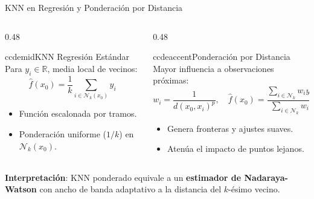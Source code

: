 \begin{frame}{KNN en Regresión y Ponderación por Distancia}
\begin{columns}[T,onlytextwidth]
\begin{column}{0.48\textwidth}
\begin{contrastbox}{ccdemid}{KNN Regresión Estándar}
\footnotesize
Para $y_i \in \mathbb{R}$, media local de vecinos:
\[
\hat{f}(x_0) = \frac{1}{k} \sum_{i \in \mathcal{N}_k(x_0)} y_i
\]
\begin{itemize}\setlength{\itemsep}{0.06em}
  \item Función escalonada por tramos.
  \item Ponderación uniforme ($1/k$) en $\mathcal{N}_k(x_0)$.
\end{itemize}
\end{contrastbox}
\end{column}

\begin{column}{0.48\textwidth}
\begin{contrastbox}{ccdeaccent}{Ponderación por Distancia}
\footnotesize
Mayor influencia a observaciones próximas:
\[
w_i = \frac{1}{d(x_0, x_i)^p}, \quad \hat{f}(x_0) = \frac{\sum_{i \in \mathcal{N}_k} w_i y_i}{\sum_{i \in \mathcal{N}_k} w_i}
\]
\begin{itemize}\setlength{\itemsep}{0.06em}
  \item Genera fronteras y ajustes suaves.
  \item Atenúa el impacto de puntos lejanos.
\end{itemize}
\end{contrastbox}
\end{column}
\end{columns}

\vspace{0.06cm}
\begin{ccdebox}
\scriptsize \textbf{Interpretación}: KNN ponderado equivale a un \textbf{estimador de Nadaraya-Watson} con ancho de banda adaptativo a la distancia del $k$-ésimo vecino.
\end{ccdebox}
\end{frame}
